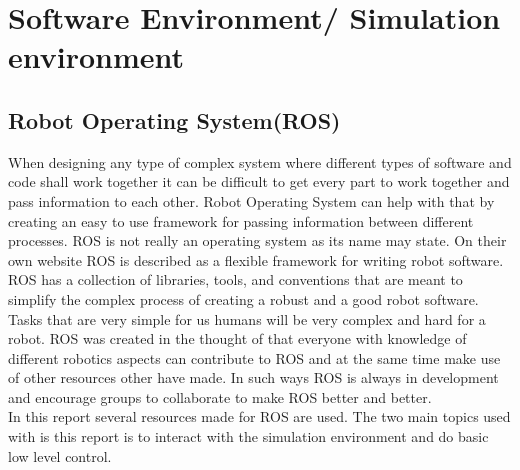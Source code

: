 \chapter{Software Environment/ Simulation environment}




\section{Robot Operating System(ROS)}
When designing any type of complex system where different types of software and code shall work together it can be difficult to get every part to work together and pass information to each other. Robot Operating System can help with that by creating an easy to use framework for passing information between different processes. ROS is not really an operating system as its name may state. On their own website ROS is described as a flexible framework for writing robot software. ROS has a collection of libraries, tools, and conventions that are meant to simplify the complex process of creating a robust and a good robot software. Tasks that are very simple for us humans will be very complex and hard for a robot. ROS was created in the thought of that everyone with knowledge of different robotics aspects can contribute to ROS and at the same time make use of other resources other have made. In such ways ROS is always in development and encourage groups to collaborate to make ROS better and better. \\

In this report several resources made for ROS are used. The two main topics used with is this report is to interact with the simulation environment and do basic low level control.


